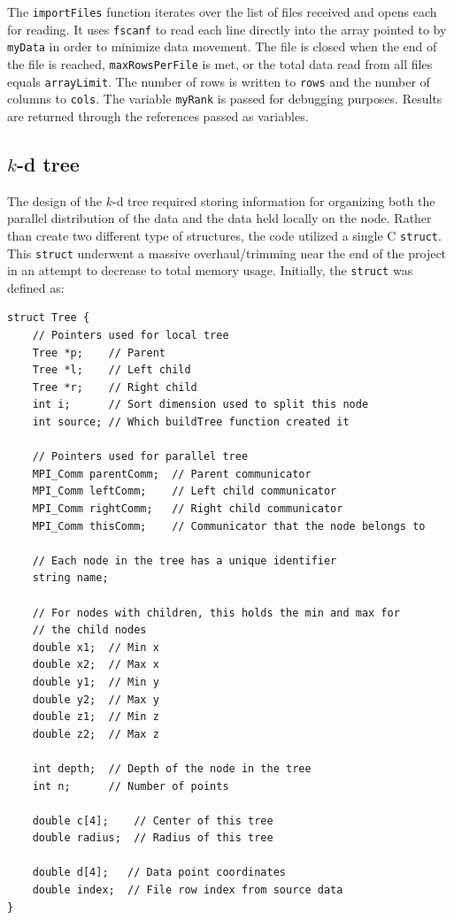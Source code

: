 \documentclass{article}
\begin{document}
The \texttt{importFiles} function iterates over the list of files received and opens each for reading. It uses \texttt{fscanf} to read each line directly into the array pointed to by \texttt{myData} in order to minimize data movement. The file is closed when the end of the file is reached, \texttt{maxRowsPerFile} is met, or the total data read from all files equals \texttt{arrayLimit}. The number of rows is written to \texttt{rows} and the number of columns to \texttt{cols}. The variable \texttt{myRank} is passed for debugging purposes. Results are returned through the references passed as variables.





%
%

\subsection{$k$-d tree}
%
%

The design of the $k$-d tree required storing information for organizing both the parallel distribution of the data and the data held locally on the node. Rather than create two different type of structures, the code utilized a single C \texttt{struct}. This \texttt{struct} underwent a massive overhaul/trimming near the end of the project in an attempt to decrease to total memory usage. Initially, the \texttt{struct} was defined as:

\begin{minipage}{\linewidth}
\lstset{language=C++, keepspaces=true}
\begin{lstlisting}
struct Tree {
    // Pointers used for local tree
	Tree *p;    // Parent
	Tree *l;    // Left child
	Tree *r;    // Right child
	int i;      // Sort dimension used to split this node
	int source; // Which buildTree function created it

    // Pointers used for parallel tree
	MPI_Comm parentComm;  // Parent communicator
	MPI_Comm leftComm;    // Left child communicator
	MPI_Comm rightComm;   // Right child communicator
	MPI_Comm thisComm;    // Communicator that the node belongs to

    // Each node in the tree has a unique identifier
	string name;

    // For nodes with children, this holds the min and max for
    // the child nodes
	double x1;  // Min x
	double x2;  // Max x
	double y1;  // Min y
	double y2;  // Max y
	double z1;  // Min z
	double z2;  // Max z

	int depth;  // Depth of the node in the tree
	int n;      // Number of points

	double c[4];    // Center of this tree
	double radius;  // Radius of this tree

	double d[4];   // Data point coordinates
	double index;  // File row index from source data
}
\end{lstlisting}
\end{minipage}
\end{document}
